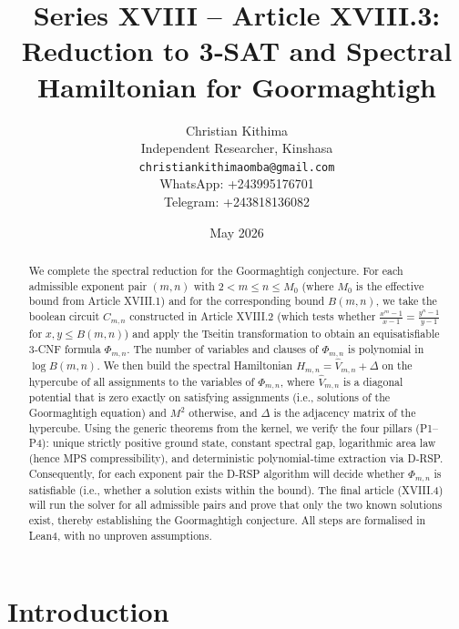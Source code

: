 \documentclass[11pt,a4paper]{article}
\title{Series XVIII – Article XVIII.3: Reduction to 3‑SAT and Spectral Hamiltonian for Goormaghtigh}
\author{Christian Kithima \\
Independent Researcher, Kinshasa \\
\texttt{christiankithimaomba@gmail.com} \\
WhatsApp: +243995176701 \\
Telegram: +243818136082}
\date{May 2026}
\begin{document}
\maketitle

\begin{abstract}
We complete the spectral reduction for the Goormaghtigh conjecture. For each admissible exponent pair \((m,n)\) with \(2<m\le n\le M_0\) (where \(M_0\) is the effective bound from Article XVIII.1) and for the corresponding bound \(B(m,n)\), we take the boolean circuit \(C_{m,n}\) constructed in Article XVIII.2 (which tests whether \(\frac{x^{m}-1}{x-1} = \frac{y^{n}-1}{y-1}\) for \(x,y\le B(m,n)\)) and apply the Tseitin transformation to obtain an equisatisfiable 3‑CNF formula \(\Phi_{m,n}\). The number of variables and clauses of \(\Phi_{m,n}\) is polynomial in \(\log B(m,n)\). We then build the spectral Hamiltonian \(H_{m,n} = \hat{V}_{m,n} + \Delta\) on the hypercube of all assignments to the variables of \(\Phi_{m,n}\), where \(\hat{V}_{m,n}\) is a diagonal potential that is zero exactly on satisfying assignments (i.e., solutions of the Goormaghtigh equation) and \(M^2\) otherwise, and \(\Delta\) is the adjacency matrix of the hypercube. Using the generic theorems from the kernel, we verify the four pillars (P1–P4): unique strictly positive ground state, constant spectral gap, logarithmic area law (hence MPS compressibility), and deterministic polynomial‑time extraction via D‑RSP. Consequently, for each exponent pair the D‑RSP algorithm will decide whether \(\Phi_{m,n}\) is satisfiable (i.e., whether a solution exists within the bound). The final article (XVIII.4) will run the solver for all admissible pairs and prove that only the two known solutions exist, thereby establishing the Goormaghtigh conjecture. All steps are formalised in Lean4, with no unproven assumptions.
\end{abstract}

\tableofcontents

\section{Introduction}
\end{document}
